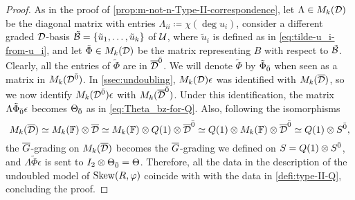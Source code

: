 \begin{proof}
    As in the proof of \cref{prop:m-not-n-Type-II-correspondence}, let $\Lambda \in M_k(\mathcal{D})$ be the diagonal matrix with entries $\Lambda_{ii} \coloneqq \chi(\deg u_i)$, consider a different graded $\mathcal{D}$-basis $\tilde {\mathcal B} = \{ \tilde u_1, \ldots, \tilde u_k \}$ of $\mathcal U$, where $\tilde u_i$ is defined as in \cref{eq:tilde-u_i-from-u_i}, and let $\tilde \Phi \in M_k(\mathcal{D})$ be the matrix representing $B$ with respect to $\tilde {\mathcal B}$. 
    Clearly, all the entries of $\tilde\Phi$ are in $\barr \D\even$. 
    We will denote $\tilde\Phi$ by $\tilde\Phi_{\bar{0}}$ when seen as a matrix in $M_k(\mathcal{D}^{\bar0})$. 
    In \cref{ssec:undoubling}, $M_k(\mathcal{D})\epsilon$ was identified with $M_k(\barr \D)$, so we now identify $M_k(\mathcal{D}^{\bar0})\epsilon$ with $M_k(\barr \D\even)$. 
    Under this identification, the matrix $\Lambda \tilde\Phi_{\bar{0}} \epsilon$ becomes $\Theta_{\bar{0}}$ as in \cref{eq:Theta_bz-for-Q}. 
    Also, following the isomorphisms
    \[
        M_k(\barr \D) \iso M_k(\FF) \tensor \barr \D \iso M_k(\FF) \tensor Q(1) \tensor \barr \D\even \iso Q(1) \tensor M_k(\FF) \tensor \barr \D\even \iso Q(1) \tensor S\even,
    \]
    the $\barr G$-grading on $M_k(\barr \D)$ becomes the $\barr G$-grading we defined on $S = Q(1) \otimes S^{\bar0}$, and $\Lambda\tilde\Phi\epsilon$ is sent to $I_2 \otimes \Theta_{\bar{0}} = \Theta$. 
    Therefore, all the data in the description of the undoubled model of $\operatorname{Skew}(R, \varphi)$ coincide with with the data in \cref{defi:type-II-Q}, concluding the proof.
\end{proof}



